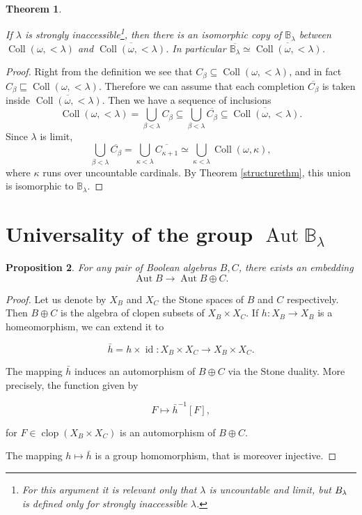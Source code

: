 \documentclass[11pt]{amsart}
\newtheorem{thm}{Theorem}[section]
\newtheorem{prop}[thm]{Proposition}
\theoremstyle{definition}
\newcommand{\aut}{\operatorname{Aut}}
\newcommand{\blim}{\mathbb{B}_\lambda}
\newcommand{\s}{\subseteq}
\newcommand{\coll}{\operatorname{Coll}(\omega,\kappa)}
\newcommand{\colllambda}{\operatorname{Coll}(\omega,<\lambda)}
\begin{document}
\begin{thm}\label{thm2}

If $\lambda$ is strongly inaccessible\footnote{For this argument it is relevant only that $\lambda$ is uncountable and limit, but $\mathbb \blim$ is defined only for strongly inaccessible $\lambda$.}, then there is an isomorphic copy of $\blim$ between $\colllambda$ and $\overline{\colllambda}$. In particular $\overline{\blim}\simeq \overline{\colllambda}$.
\end{thm}
\begin{proof}
    Right from the definition we see that $C_\beta \subseteq \colllambda$, and in fact $C_\beta \sqsubseteq \colllambda$.  Therefore we can assume that each completion $\overline{C_\beta}$ is taken inside $\overline{\colllambda}$. Then we have a sequence of inclusions
    $$\colllambda = \bigcup_{\beta<\lambda}C_\beta \s \bigcup_{\beta<\lambda}\overline{C_\beta} \s \overline{\colllambda}.$$
    Since $\lambda$ is limit,
    $$\bigcup_{\beta<\lambda}\overline{C_\beta}=\bigcup_{\kappa<\lambda}\overline{C_{\kappa+1}}\simeq \bigcup_{\kappa <\lambda} \coll,$$ 
    where $\kappa$ runs over uncountable cardinals. By Theorem \ref{structurethm}, this union is isomorphic to $\blim$.

\end{proof}



\section{Universality of the group $\aut{\blim}$}

 

\begin{prop} \label{prop1}
	For any pair of Boolean algebras $B,C$, there exists an embedding
	$$\aut{B} \longrightarrow \aut{B \oplus C}.$$
\end{prop}

\begin{proof}
	Let us denote by $X_B$ and $X_C$ the Stone spaces of $B$ and $C$ respectively.
	Then $B \oplus C$ is the algebra of clopen subsets of $X_B \times X_C$. If $h:X_B \longrightarrow X_B$ is a homeomorphism, we can extend it to
    
	$$\bar{h}=h \times \operatorname{id} :X_B \times X_C \longrightarrow X_B \times X_C.$$
	
	The mapping $\bar{h}$ induces an automorphism of $B\oplus C$ via the Stone duality. More precisely, the function given by
    
	$$F \mapsto \bar{h}^{-1}[F],$$
    
	for $F\in \operatorname{clop}(X_B \times X_C)$ is an automorphism of $B\oplus C$.

    The mapping $h  \mapsto \bar{h}$ is a group homomorphism, that is moreover injective.	
\end{proof}
\end{document}
